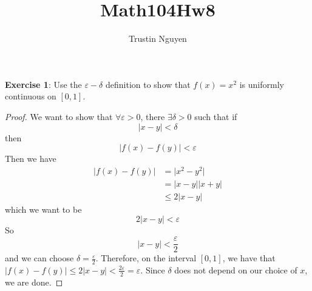 \documentclass{article}
\title{Math104Hw8}
\author{Trustin Nguyen}
\begin{document}
    \maketitle

\reversemarginpar

\textbf{Exercise 1}: Use the $\varepsilon-\delta$ definition to show that $f(x) = x^{2}$ is uniformly continuous on $[0, 1]$.
    \begin{proof}
        We want to show that $\forall \varepsilon> 0$, there $\exists \delta> 0$ such that if
            \begin{equation*}
                \lvert x - y \rvert< \delta
            \end{equation*}
        then
            \begin{equation*}
                \lvert f(x) - f(y) \rvert< \varepsilon
            \end{equation*}
        Then we have
            \begin{align*}
                \lvert f(x) - f(y) \rvert &=     \lvert x^{2} - y^{2} \rvert              \\
                                          &=     \lvert  x - y \rvert \lvert x + y \rvert \\
                                          & \leq  2\lvert x - y \rvert                      
            \end{align*}
        which we want to be 
            \begin{equation*}
                2\lvert x - y \rvert < \varepsilon
            \end{equation*}
        So 
            \begin{equation*}
                \lvert x -y  \rvert< \dfrac{\varepsilon}{ 2}
            \end{equation*}
        and we can choose $\delta = \frac{\varepsilon}{2}$. Therefore, on the interval $[0, 1]$, we have that $\lvert f(x) - f(y) \rvert \leq 2\lvert x - y \rvert < \frac{2\varepsilon}{ 2} = \varepsilon$. Since $\delta$ does not depend on our choice of $x$, we are done.
    \end{proof}
\end{document}
